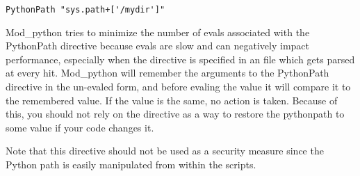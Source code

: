 \begin{verbatim}
PythonPath "sys.path+['/mydir']"
\end{verbatim}

Mod_python tries to minimize the number of evals associated with the
PythonPath directive because evals are slow and can negatively impact
performance, especially when the directive is specified in an
 file which gets parsed at every hit. Mod_python will
remember the arguments to the PythonPath directive in the un-evaled
form, and before evaling the value it will compare it to the
remembered value. If the value is the same, no action is
taken. Because of this, you should not rely on the directive as a way
to restore the pythonpath to some value if your code changes it.

Note that this directive should not be used as a security measure
since the Python path is easily manipulated from within the scripts.

